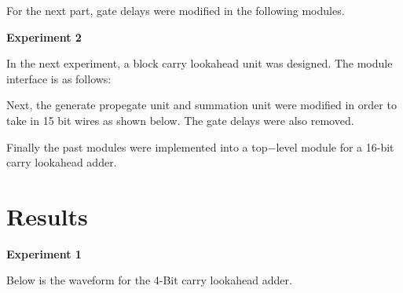 \documentclass[a4paper,12pt]{article}
\begin{document}
  
  
  For the next part, gate delays were modified in the following modules.
  
  

  
  
  

  \hspace{-15pt}\textbf{Experiment 2}
  
  In the next experiment, a block carry lookahead unit was designed. The module interface is as follows:

  
  
  Next, the generate propegate unit and summation unit were modified in order to take in 15 bit wires as shown below. The gate delays were also removed.
  
  
  
  
  
  Finally the past modules were implemented into a top−level module for a 16-bit carry lookahead adder.
  
  
  
\newpage

\section*{Results}

  \textbf{Experiment 1}
  
  Below is the waveform for the 4-Bit carry lookahead adder.
\end{document}
